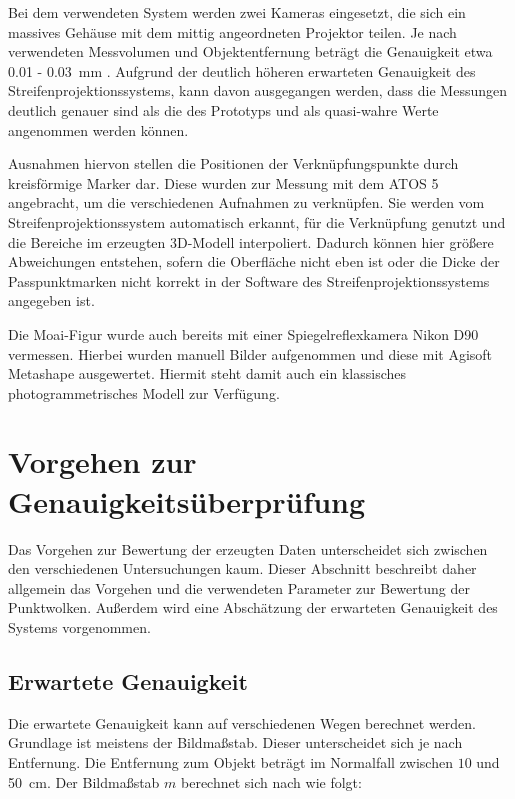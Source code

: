 \documentclass[./00PhotoBox.tex]{subfiles}
\begin{document}
Bei dem verwendeten System werden zwei Kameras eingesetzt, die sich ein massives Gehäuse mit dem mittig angeordneten Projektor teilen. Je nach verwendeten Messvolumen und Objektentfernung beträgt die Genauigkeit etwa \SI{0,01}{} - \SI{0,03}{\milli\metre} \citep{atos}. Aufgrund der deutlich höheren erwarteten Genauigkeit des Streifenprojektionssystems, kann davon ausgegangen werden, dass die Messungen deutlich genauer sind als die des Prototyps und als quasi-wahre Werte angenommen werden können.

Ausnahmen hiervon stellen die Positionen der Verknüpfungspunkte durch kreisförmige Marker dar. Diese wurden zur Messung mit dem ATOS 5 angebracht, um die verschiedenen Aufnahmen zu verknüpfen. Sie werden vom Streifenprojektionssystem automatisch erkannt, für die Verknüpfung genutzt und die Bereiche im erzeugten 3D-Modell interpoliert. Dadurch können hier größere Abweichungen entstehen, sofern die Oberfläche nicht eben ist oder die Dicke der Passpunktmarken nicht korrekt in der Software des Streifenprojektionssystems angegeben ist.

Die Moai-Figur wurde auch bereits mit einer Spiegelreflexkamera Nikon D90 vermessen. Hierbei wurden manuell Bilder aufgenommen und diese mit Agisoft Metashape ausgewertet. Hiermit steht damit auch ein klassisches photogrammetrisches Modell zur Verfügung.


\section{Vorgehen zur Genauigkeitsüberprüfung}

Das Vorgehen zur Bewertung der erzeugten Daten unterscheidet sich zwischen den verschiedenen Untersuchungen kaum. Dieser Abschnitt beschreibt daher allgemein das Vorgehen und die verwendeten Parameter zur Bewertung der Punktwolken. Außerdem wird eine Abschätzung der erwarteten Genauigkeit des Systems vorgenommen.


\subsection{Erwartete Genauigkeit}
\label{ss:erwartete_genauigkeit}
Die erwartete Genauigkeit kann auf verschiedenen Wegen berechnet werden. Grundlage ist meistens der Bildmaßstab. Dieser unterscheidet sich je nach Entfernung. Die Entfernung zum Objekt beträgt im Normalfall zwischen $10$ und \SI{50}{\centi\metre}. Der Bildmaßstab $m$ berechnet sich nach \cite[S. 171]{luhmann} wie folgt:
\end{document}
